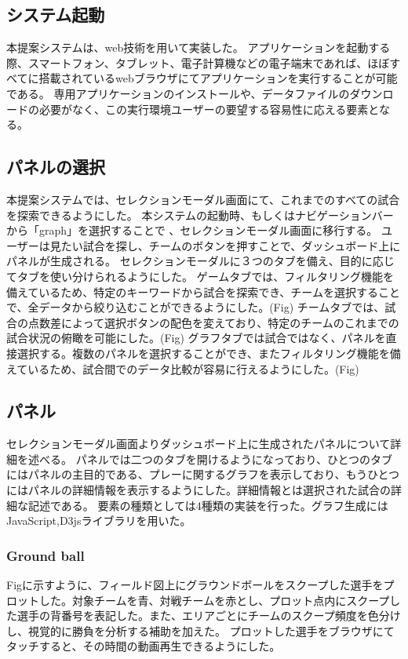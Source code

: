 \documentclass[sotsuron]{kuee}
\begin{document}
		\subsection{システム起動}
			本提案システムは、web技術を用いて実装した。
			アプリケーションを起動する際、スマートフォン、タブレット、電子計算機などの電子端末であれば、ほぼすべてに搭載されているwebブラウザにてアプリケーションを実行することが可能である。
			専用アプリケーションのインストールや、データファイルのダウンロードの必要がなく、この実行環境ユーザーの要望する容易性に応える要素となる。
		\subsection{パネルの選択}
			本提案システムでは、セレクションモーダル画面にて、これまでのすべての試合を探索できるようにした。
			本システムの起動時、もしくはナビゲーションバーから「graph」を選択することで	、セレクションモーダル画面に移行する。
			ユーザーは見たい試合を探し、チームのボタンを押すことで、ダッシュボード上にパネルが生成される。
			セレクションモーダルに３つのタブを備え、目的に応じてタブを使い分けられるようにした。
			ゲームタブでは、フィルタリング機能を備えているため、特定のキーワードから試合を探索でき、チームを選択することで、全データから絞り込むことができるようにした。(Fig)
			チームタブでは、試合の点数差によって選択ボタンの配色を変えており、特定のチームのこれまでの試合状況の俯瞰を可能にした。(Fig)
			グラフタブでは試合ではなく、パネルを直接選択する。複数のパネルを選択することができ、またフィルタリング機能を備えているため、試合間でのデータ比較が容易に行えるようにした。(Fig)
		\subsection{パネル}
			セレクションモーダル画面よりダッシュボード上に生成されたパネルについて詳細を述べる。
			パネルでは二つのタブを開けるようになっており、ひとつのタブにはパネルの主目的である、プレーに関するグラフを表示しており、もうひとつにはパネルの詳細情報を表示するようにした。詳細情報とは選択された試合の詳細な記述である。
			要素の種類としては4種類の実装を行った。グラフ生成にはJavaScript,D3jsライブラリを用いた。
			\subsubsection{Ground ball}
			Figに示すように、フィールド図上にグラウンドボールをスクープした選手をプロットした。対象チームを青、対戦チームを赤とし、プロット点内にスクープした選手の背番号を表記した。また、エリアごとにチームのスクープ頻度を色分けし、視覚的に勝負を分析する補助を加えた。
			プロットした選手をブラウザにてタッチすると、その時間の動画再生できるようにした。
\end{document}
